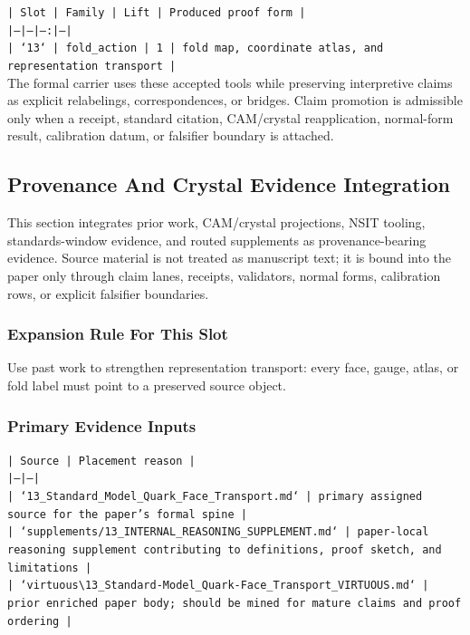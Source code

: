 \documentclass[11pt]{article}
\begin{document}
\noindent\texttt{| Slot | Family | Lift | Produced proof form |}\\
\noindent\texttt{|---|---|---:|---|}\\
\noindent\texttt{| `13` | fold\_action | 1 | fold map, coordinate atlas, and representation transport |}\\

The formal carrier uses these accepted tools while preserving interpretive
claims as explicit relabelings, correspondences, or bridges. Claim promotion is admissible only when a receipt, standard citation,
CAM/crystal reapplication, normal-form result, calibration datum, or falsifier
boundary is attached.

\subsection*{Provenance And Crystal Evidence Integration}

This section integrates prior work, CAM/crystal projections, NSIT tooling,
standards-window evidence, and routed supplements as provenance-bearing
evidence. Source material is not treated as manuscript text; it is bound into
the paper only through claim lanes, receipts, validators, normal forms,
calibration rows, or explicit falsifier boundaries.

\subsubsection*{Expansion Rule For This Slot}

Use past work to strengthen representation transport: every face, gauge, atlas, or fold label must point to a preserved source object.

\subsubsection*{Primary Evidence Inputs}

\noindent\texttt{| Source | Placement reason |}\\
\noindent\texttt{|---|---|}\\
\noindent\texttt{| `13\_Standard\_Model\_Quark\_Face\_Transport.md` | primary assigned source for the paper's formal spine |}\\
\noindent\texttt{| `supplements/13\_INTERNAL\_REASONING\_SUPPLEMENT.md` | paper-local reasoning supplement contributing to definitions, proof sketch, and limitations |}\\
\noindent\texttt{| `virtuous\textbackslash{}13\_Standard-Model\_Quark-Face\_Transport\_VIRTUOUS.md` | prior enriched paper body; should be mined for mature claims and proof ordering |}\\
\end{document}
